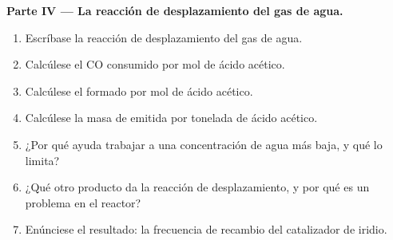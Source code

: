 \begin{problem}
\medskip\noindent\textbf{Parte IV --- La reacción de desplazamiento del gas de agua.}
\begin{enumerate}[resume]
  \item Escríbase la reacción de desplazamiento del gas de agua.
  \item Calcúlese el CO consumido por mol de ácido acético.
  \item Calcúlese el  formado por mol de ácido acético.
  \item Calcúlese la masa de  emitida por tonelada de ácido acético.
  \item ¿Por qué ayuda trabajar a una concentración de agua más baja, y qué lo limita?
  \item ¿Qué otro producto da la reacción de desplazamiento, y por qué es un problema en el
        reactor?
  \item Enúnciese el resultado: la frecuencia de recambio del catalizador de iridio.
\end{enumerate}
\end{problem}
